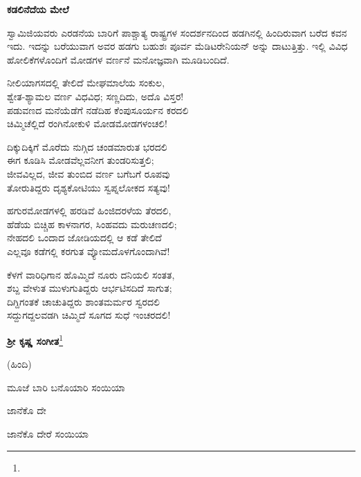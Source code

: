\begin{center}
\textbf{ಕಡಲಿನೆದೆಯ ಮೇಲೆ}
\end{center}

ಸ್ವಾಮಿಜಿಯವರು ಎರಡನೆಯ ಬಾರಿಗೆ ಪಾಶ್ಚಾತ್ಯ ರಾಷ್ಟ್ರಗಳ ಸಂದರ್ಶನದಿಂದ ಹಡಗಿನಲ್ಲಿ ಹಿಂದಿರುವಾಗ ಬರೆದ ಕವನ ಇದು. ಇದನ್ನು ಬರೆಯುವಾಗ ಅವರ ಹಡಗು ಬಹುಶಃ ಪೂರ್ವ ಮೆಡಿಟರೇನಿಯನ್‌ ಅನ್ನು ದಾಟುತ್ತಿತ್ತು. ಇಲ್ಲಿ ವಿವಿಧ ಹೋಲಿಕೆಗಳೊಂದಿಗೆ ಮೋಡಗಳ ವರ್ಣನೆ ಮನೋಜ್ಞವಾಗಿ ಮೂಡಿಬಂದಿದೆ.

ನೀಲಿಯಾಗಸದಲ್ಲಿ ತೇಲಿದೆ ಮೇಘಮಾಲೆಯ ಸಂಕುಲ,\\ಶ್ವೇತ-ಶ್ಯಾಮಲ ವರ್ಣ ವಿಧವಿಧ; ಸಣ್ಣದಿದು, ಅದೊ ವಿಸ್ತರ!\\ಪಡುವಣದ ಮನೆಯೆಡೆಗೆ ನಡೆದಿಹ ಕೆಂಪುಸೂರ್ಯನ ಕರದಲಿ\\ಚಿಮ್ಮಿಚೆಲ್ಲಿದೆ ರಂಗಿನೋಕುಳಿ ಮೋಡಮೋಡಗಳಂಚಲಿ!

ದಿಕ್ಕುದಿಕ್ಕಿಗೆ ಮೊರೆದು ನುಗ್ಗಿದ ಚಂಡಮಾರುತ ಭರದಲಿ\\ಈಗ ಕೂಡಿಸಿ ಮೋಡವೆಲ್ಲವನೀಗ ತುಂಡರಿಸುತ್ತಲಿ;\\ಜೀವವಿಲ್ಲದ, ಜೀವ ತುಂಬಿದ ವರ್ಣ ಬಗೆಬಗೆ ರೂಪವು\\ತೋರುತಿದ್ದರು ದೃಶ್ಯಕೋಟಿಯು ಸ್ವಪ್ನಲೋಕದ ಸತ್ಯವು!

ಹಗುರಮೋಡಗಳಲ್ಲಿ ಹರಡಿವೆ ಹಿಂಜಿದರಳೆಯ ತೆರದಲಿ,\\ಹೆಡೆಯ ಬಿಚ್ಚಿಹ ಕಾಳನಾಗರ, ಸಿಂಹವದು ಮರುಚಣದಲಿ;\\ನೇಹದಲಿ ಒಂದಾದ ಜೋಡಿಯದಲ್ಲಿ ಆ ಕಡೆ ತೇಲಿದೆ\\ಎಲ್ಲವೂ ಕಡೆಗಲ್ಲಿ ಕರಗುತ ವ್ಯೋಮದೊಳಗೊಂದಾಗಿವೆ!

ಕೆಳಗೆ ವಾರಿಧಿಗಾನ ಹೊಮ್ಮಿದೆ ನೂರು ದನಿಯಲಿ ಸಂತತ,\\ಶಬ್ದ ವೇಳುತ ಮುಳುಗುತಿದ್ದರು ಆರ್ಭಟಿಸದಿದೆ ಸಾಗುತ;\\ದಿಗ್ದಿಗಂತಕೆ ಚಾಚುತಿದ್ದರು ಶಾಂತಮರ್ಮರ ಸ್ವರದಲಿ\\ಸದ್ದುಗದ್ದಲವಡಗಿ ಚಿಮ್ಮಿದೆ ಸೂಗದ ಸುಧೆ ಇಂಚರದಲಿ!

\begin{center}
\textbf{ಶ‍್ರೀ ಕೃಷ್ಣ ಸಂಗೀತ}\footnote{}
\end{center}

\begin{center}
(ಹಿಂದಿ)
\end{center}

\begin{myquote}
ಮೂಜೆ ಬಾರಿ ಬನೊಯಾರಿ ಸಂಯಿಯಾ
\end{myquote}

\begin{flushright}
ಜಾನೆಕೊ ದೇ
\end{flushright}

\begin{myquote}
ಜಾನೆಕೊ ದೇರೆ ಸಂಯಿಯಾ
\end{myquote}

